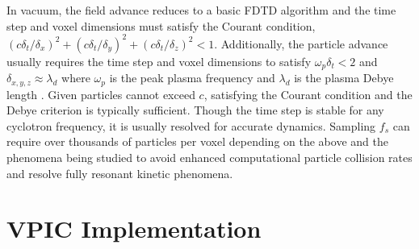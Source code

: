 \documentclass[journal,twoside]{IEEEtran}
\begin{document}
In vacuum, the field advance reduces to a basic FDTD algorithm
\cite{Yee_1966} and the time step and voxel dimensions must satisfy the
Courant condition,
$\left(c\delta_t/\delta_x\right)^2 +
 \left(c\delta_t/\delta_y\right)^2 +
 \left(c\delta_t/\delta_z\right)^2 < 1$.
Additionally, the particle advance usually requires the time step and
voxel dimensions to satisfy $\omega_p \delta_t < 2$ and
$\delta_{x,y,z}
\approx \lambda_d$ where $\omega_p$ is the peak plasma frequency and
$\lambda_d$ is the plasma Debye length
\cite{Birdsall_Langdon_1985,Hockney_Eastwood_1988}.
Given particles cannot exceed $c$, satisfying the Courant condition
and the Debye criterion is typically sufficient.  Though the time step
is stable for any cyclotron frequency, it is usually resolved for
accurate dynamics.  Sampling $f_s$ can require over thousands of
particles per voxel depending on the above and the phenomena being
studied to avoid enhanced computational particle collision rates and
resolve fully resonant kinetic phenomena.

\section{VPIC Implementation}
\end{document}
